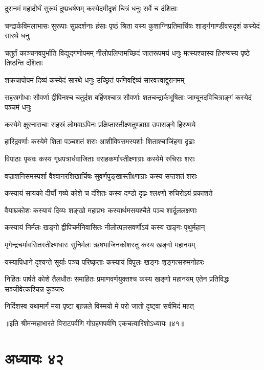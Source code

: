 \twolineshloka
{दुरानमं महादीर्घं सुरूपं दुष्प्रधर्षणम्}
{कस्येदमीदृशं चित्रं धनुः सर्वे च दंशिताः}


\threelineshloka
{चन्द्रार्कविमलाभासः सुरूपाः सुप्रदर्शनाः}
{हंसाः पृष्ठं श्रिता यस्य कुशाग्निप्रतिमार्चिषः}
{शार्ङ्गगाण्डीवसदृशं कस्येदं सारथे धनुः}


\threelineshloka
{चतुर्तं काञ्चनवपुर्भाति विद्युद्गणोपमम्}
{नीलोपलिप्तमच्छिदं जातरूपमयं धनुः}
{मत्स्यश्चास्य हिरण्यस्य पृष्ठे तिष्ठन्ति दंशिताः}


\twolineshloka
{शक्रचापोपमं दिव्यं कस्येदं सारथे धनुः}
{उच्छ्रितं फणिवद्दिव्यं सारवत्त्वाद्दुरानमम्}


\threelineshloka
{सहस्रगोधाः सौवर्णा द्वीपिनश्च चतुर्दश}
{बर्हिणश्चात्र सौवर्णाः शतचन्द्रार्कभूषिताः}
{जाम्बूनदविचित्राङ्गं कस्येदं पञ्चमं धनुः}


\twolineshloka
{कस्येमे क्षुरनाराचाः सहस्रं लोमवाऽपिनः}
{प्रक्षिप्तास्तीक्ष्णतुण्डाग्रा उपासङ्गे हिरण्मये}


\twolineshloka
{हारिद्रवर्णाः कस्येमे शिता पञ्चशतं शराः}
{आशीविषसमस्पर्शाः शिताश्चाजिंहगा दृढाः}


\twolineshloka
{विपाठाः पृथवः कस्य गृध्रपत्रार्धवाजिताः}
{वराहकर्णास्तीक्ष्णाग्राः कस्येमे रुचिराः शराः}


\twolineshloka
{वज्राशनिसमस्पर्शा वैश्वानरशिखार्चिषः}
{सुवर्णपुङ्खास्तीक्ष्णाग्राः कस्य सप्तशतं शराः}


\twolineshloka
{कस्यायं सायको दीर्घो गव्ये कोशे च दंशितः}
{कस्य दण्डो दृढः श्लक्ष्णो रुचिरोऽयं प्रकाशते}


\twolineshloka
{वैयाघ्रकोशः कस्यायं दिव्यः शङ्खो महाप्रभः}
{कस्यार्थमसयश्चैते पञ्च शार्दूललक्षणाः}


\twolineshloka
{कस्यायं निर्मलः खङ्गो द्वीपिचर्मनिवासितः}
{नीलोत्पलसवर्णोऽयं कस्य खङ्गः पृथुर्महान्}


\twolineshloka
{मृगेन्द्रचर्मावसितस्तीक्ष्णधारः सुनिर्मलः}
{ऋषभाजिनकोशस्तु कस्य खङ्गो महानयम्}


\twolineshloka
{यस्यापिधाने दृश्यन्ते सूर्याः पञ्च परिष्कृताः}
{कस्यायं विपुलः खङ्गः शृङ्गत्सरुमनोहरः}


\threelineshloka
{निहितः पार्षते कोशे तैलधौतः समाहितः}
{प्रमाणवर्णयुक्तश्च कस्य खङ्गो महानयम्}
{एतेन प्रतिविद्धः सञ्जीवेत्कश्चिन्न कुञ्जरः}


\twolineshloka
{निर्दिशस्व यथामार्गं मया पृष्टा बृहन्नले}
{विस्मयो मे परो जातो दृष्ट्वा सर्वमिदं महत्}

॥इति श्रीमन्महाभारते विराटपर्वणि गोग्रहणपर्वणि एकचत्वारिंशोऽध्यायः॥४१॥

\chapter{अध्यायः ४२}

